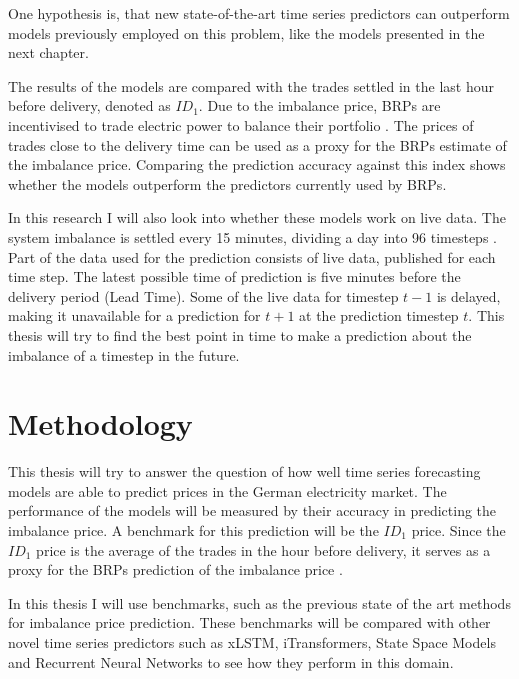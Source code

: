 \documentclass[class=scrbook, crop=false]{standalone}
\begin{document}
One hypothesis is, that new state-of-the-art time series predictors can outperform models previously employed on this problem, like the models presented in the next chapter. 

The results of the models are compared with the trades settled in the last hour before delivery, denoted as $ID_1$. Due to the imbalance price, BRPs are incentivised to trade electric power to balance their portfolio \cite{kochPASSIVEBALANCINGINTRADAY2020a}. The prices of trades close to the delivery time can be used as a proxy for the BRPs estimate of the imbalance price. Comparing the prediction accuracy against this index shows whether the models outperform the predictors currently used by BRPs.

 In this research I will also look into whether these models work on live data. The system imbalance is settled every 15 minutes, dividing a day into 96 timesteps \cite{NetztransparenzReBAP}. Part of the data used for the prediction consists of live data, published for each time step. 
The latest possible time of prediction is five minutes before the delivery period \cite{EPEXTradingBrochure} (Lead Time). Some of the live data for timestep $t-1$ is delayed, making it unavailable for a prediction for $t+1$ at the prediction timestep $t$. This thesis will try to find the best point in time to make a prediction about the imbalance of a timestep in the future.



\section{Methodology}
\label{Section::Methodology}
This thesis will try to answer the question of how well time series forecasting models are able to predict prices in the German electricity market. The performance of the models will be measured by their accuracy in predicting the imbalance price. A benchmark for this prediction will be the $ID_1$ price. Since the $ID_1$ price is the average of the trades in the hour before delivery, it serves as a proxy for the BRPs prediction of the imbalance price \cite{narajewskiProbabilisticForecastingGerman2022}. 

In this thesis I will use benchmarks, such as the previous state of the art methods for imbalance price prediction. These benchmarks will be compared with other novel time series predictors such as xLSTM, iTransformers, State Space Models and Recurrent Neural Networks to see how they perform in this domain.
\end{document}
